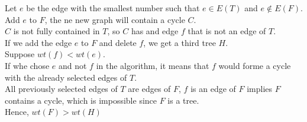 \documentclass[../main.tex]{subfiles}
\begin{document}
Let $e$ be the edge with the smallest number such that $e \in E( T) $ and $e \notin E( F) .$ \\
Add $e$ to $F$, the ne new graph will contain a cycle $C$.\\
$C$ is not fully contained in $T$, so $C$ has and edge $f$ that is not an edge of $T$.\\
If we add the edge $e$ to $F$ and delete $f$, we get a third tree $H$.\\
Suppose $wt( f) < wt( e ) $.\\
If whe chose $e$ and not $f$ in the algorithm, it means that $f$ would forme a cycle with the already selected edges of $T$.\\
All previously selected edges of $T$ are edges of $F$, $f$ is an edge of $F$ implies $F$ contains a cycle, which is impossible since $F$ is a tree.\\
Hence,  $wt( F)> wt( H)  $
\end{document}
